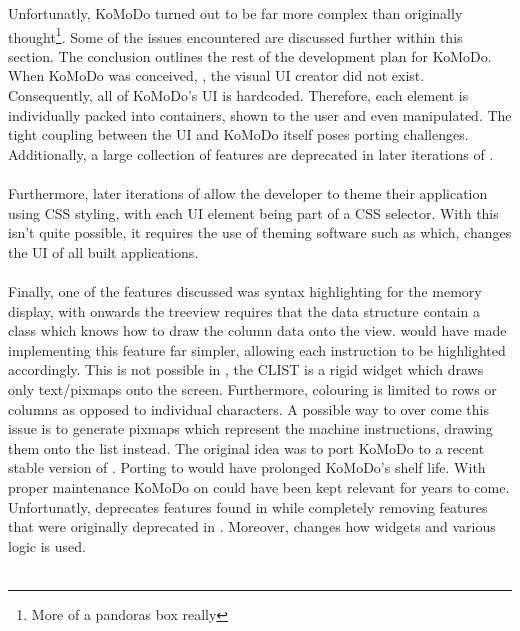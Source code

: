 \graphicspath{ {images/impl/} }
  Unfortunatly, KoMoDo turned out to be far more complex than originally thought\footnote{More of a pandoras box really}. Some of the issues encountered are discussed further within this section. The conclusion outlines the rest of the development plan for KoMoDo.
    When KoMoDo was conceived, , the visual UI creator did not exist. Consequently, all of KoMoDo's UI is hardcoded. Therefore, each element is individually packed into containers, shown to the user and even manipulated. The tight coupling between the UI and KoMoDo itself poses porting challenges. Additionally, a large collection of features are deprecated in later iterations of .\\\\
    Furthermore, later iterations of  allow the developer to theme their application using CSS styling, with each UI element being part of a CSS selector. With  this isn't quite possible, it requires the use of theming software such as  which, changes the UI of all  built applications.\\\\
    Finally, one of the features discussed was syntax highlighting for the memory display, with  onwards the treeview requires that the data structure contain a class which knows how to draw the column data onto the view.  would have made implementing this feature far simpler, allowing each instruction to be highlighted accordingly. This is not possible in , the CLIST is a rigid widget which draws only text/pixmaps onto the screen. Furthermore, colouring is limited to rows or columns as opposed to individual characters. A possible way to over come this issue is to generate pixmaps which represent the machine instructions, drawing them onto the list instead.
    The original idea was to port KoMoDo to a recent stable version of . Porting to  would have prolonged KoMoDo's shelf life. With proper maintenance KoMoDo on  could have been kept relevant for years to come. Unfortunatly,  deprecates features found in  while completely removing features that were originally deprecated in . Moreover,  changes how widgets and various logic is used.\\\\
